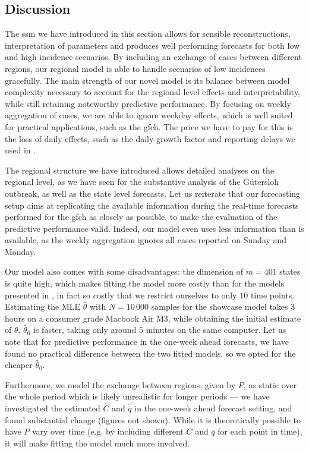 \subsection{Discussion}

The \gls{ssm} we have introduced in this section allows for sensible reconstructions, interpretation of parameters and produces well performing forecasts for both low and high incidence scenarios. By including an exchange of cases between different regions, our regional model is able to handle scenarios of low incidences gracefully. The main strength of our novel model is its balance between model complexity necessary to account for the regional level effects and interpretability, while still retaining noteworthy predictive performance. By focusing on weekly aggregation of cases, we are able to ignore weekday effects, which is well suited for practical applications, such as the \gls{gfch}. The price we have to pay for this is the loss of daily effects, such as the daily growth factor and reporting delays we used in . 

The regional structure we have introduced allows detailed analyses on the regional level, as we have seen for the substantive analysis of the Gütersloh outbreak, as well as the state level forecasts.
Let us reiterate that our forecasting setup aims at replicating the available information during the real-time forecasts performed for the \gls{gfch} as closely as possible, to make the evaluation of the predictive performance valid. Indeed, our model even uses less information than is available, as the weekly aggregation ignores all cases reported on Sunday and Monday. 

Our model also comes with some disadvantages: the dimension of $m=401$ states is quite high, which makes fitting the model more costly than for the models presented in , in fact so costly that we restrict ourselves to only $10$ time points. Estimating the MLE $\hat\theta$ with $N=10\,000$ samples for the showcase model takes 3 hours on a consumer grade Macbook Air M3, while obtaining the initial estimate of $\theta$, $\hat\theta_{0}$ is faster, taking only around $5$ minutes on the same computer. Let us note that for predictive performance in the one-week ahead forecasts, we have found no practical difference between the two fitted models, so we opted for the cheaper $\hat\theta_{0}$. 

Furthermore, we model the exchange between regions, given by $P$, as static over the whole period which is likely unrealistic for longer periods --- we have investigated the estimated $\hat C$ and $\hat{\bar q}$ in the one-week ahead forecast setting, and found substantial change (figures not shown). While it is theoretically possible to have $P$ vary over time (e.g. by including different $C$ and $\bar q$ for each point in time), it will make fitting the model much more involved. 

